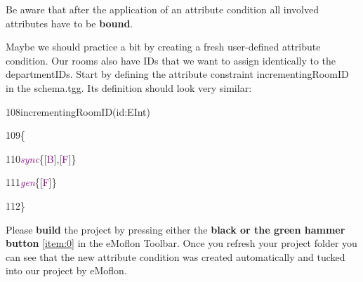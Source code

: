 {%
%
%
%
%

Be aware that after the application of an attribute condition all involved attributes have to be \textbf{bound}.\newline

Maybe we should practice a bit by creating a fresh user-defined attribute condition. Our rooms also have IDs that we want to assign identically to the departmentIDs. Start by defining the attribute constraint \textsf{incrementingRoomID} in the \textsf{schema.tgg}. Its definition should look very similar:\newline

{

108\hspace{0.5cm}incrementingRoomID(id:EInt)

109\hspace{0.5cm}\{
	
110\hspace{1cm}\textcolor{Purple}{\textit{sync}}\{[\textcolor{Purple}{B}],[\textcolor{Purple}{F}]\}
		
111\hspace{1cm}\textcolor{Purple}{\textit{gen}}\{[\textcolor{Purple}{F}]\}
		
112\hspace{0.5cm}\}\newline

}

Please \textbf{build} the project by pressing either the \textbf{black or the green hammer button} \ref{item:0} in the eMoflon Toolbar. Once you refresh your project folder you can see that the new attribute condition was created automatically and tucked into our project by eMoflon.

}
